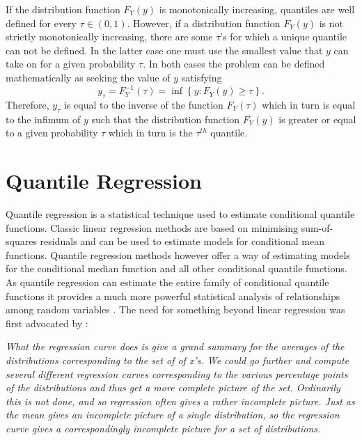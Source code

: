 \documentclass[12pt,a4paper]{report}
\begin{document}
If the distribution function $F_{Y}(y)$ is monotonically increasing, quantiles are well defined for every $\tau \in (0,1)$. However, if a distribution function $F_{Y}(y)$ is not strictly monotonically increasing, there are some $\tau$'s for which a unique quantile can not be defined. In the latter case one must use the smallest value that $y$ can take on for a given probability $\tau$. In both cases the problem can be defined mathematically as seeking the value of $y$ satisfying
\begin{equation}
\label{eq:Quantiles}
    y_{\tau}=F^{-1}_{Y}(\tau)=\inf\left\{y:F_{Y}(y)\geq\tau\right\}.
\end{equation}
\vspace{2mm}
Therefore, $y_{\tau}$ is equal to the inverse of the function $F_{Y}(\tau)$ which in turn is equal to the infimum of $y$ such that the distribution function $F_{Y}(y)$ is greater or equal to a given probability $\tau$ which in turn is the $\tau^{th}$ quantile.

\section{Quantile Regression}
Quantile regression is a statistical technique used to estimate conditional quantile functions. Classic linear regression methods are based on minimising sum-of-squares residuals and can be used to estimate models for conditional mean functions. Quantile regression methods however offer a way of estimating models for the conditional median function and all other conditional quantile functions. As quantile regression can estimate the entire family of
conditional quantile functions it provides a much more powerful statistical analysis of relationships among random variables \citep{QR-Intro}. The need for something beyond linear regression was first advocated by \citet{Motivation}:
\vspace{2mm}

\par \noindent
{\textit{What the regression curve does is give a grand summary for the averages of the distributions corresponding to the set of of x's. We could go further and compute several different regression curves corresponding to the various percentage points of the distributions and thus get a more complete picture of the set. Ordinarily this is not done, and so regression often gives a rather incomplete picture. Just as the mean gives an incomplete picture of a single distribution, so the regression curve gives a correspondingly incomplete picture for a set of distributions.} \citep{Motivation}}
\vspace{2mm}
\end{document}
